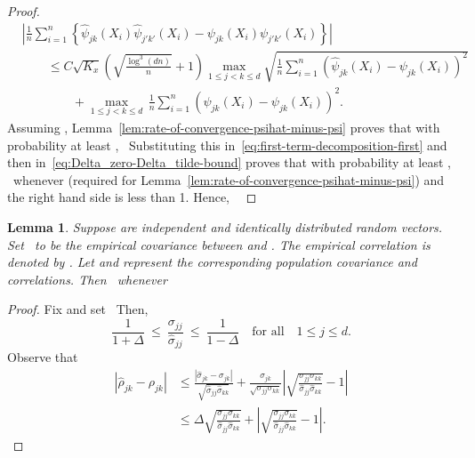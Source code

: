 \documentclass{article}
\newtheorem{lemma}{Lemma}
\begin{document}
\begin{appendices}
\begin{proof}
\begin{equation}\label{eq:first-term-decomposition-first}
\begin{split}
&\left|\frac{1}{n}\sum_{i=1}^n \left\{\widehat{\psi}_{jk}(X_i)\widehat{\psi}_{j'k'}(X_i) - \psi_{jk}(X_i)\psi_{j'k'}(X_i)\right\}\right|\\ &\qquad\le C\sqrt{K_x}\left(\sqrt{\frac{\log^3(dn)}{n}} + 1\right)\max_{1\le j < k\le d}\sqrt{\frac{1}{n}\sum_{i=1}^n \left(\widehat{\psi}_{jk}(X_i) - \psi_{jk}(X_i)\right)^2}\\ &\qquad\qquad+ \max_{1\le j < k\le d}\,{\frac{1}{n}\sum_{i=1}^n \left(\widehat{\psi}_{jk}(X_i) - \psi_{jk}(X_i)\right)^2}.
\end{split}
\end{equation}
Assuming  , Lemma~\ref{lem:rate-of-convergence-psihat-minus-psi} proves that with probability at least  ,
\ Substituting this in~\eqref{eq:first-term-decomposition-first} and then in~\eqref{eq:Delta_zero-Delta_tilde-bound} proves that with probability at least  ,
\ whenever
  (required for Lemma~\ref{lem:rate-of-convergence-psihat-minus-psi}) and the right hand side is less than 1. Hence,
\ \end{proof}
\begin{lemma}\label{lem:correlations-from-covariances}
Suppose   are independent and identically distributed random vectors. Set
\ to be the empirical covariance between   and  . The empirical correlation   is denoted by  . Let   and   represent the corresponding population covariance and correlations. Then
\ whenever
\ \end{lemma}
\begin{proof}
Fix   and set
\ Then,
\begin{equation}\label{eq:Delta-definition}
\frac{1}{1 + \Delta} ~\le~ \frac{\sigma_{jj}}{\widehat{\sigma}_{jj}} ~\le~ \frac{1}{1-\Delta}\quad\mbox{for all}\quad 1\le j\le d.
\end{equation}
Observe that
\begin{align*}
\left|\widehat{\rho}_{jk} - \rho_{jk}\right| &\le \frac{|\widehat{\sigma}_{jk} - \sigma_{jk}|}{\sqrt{\widehat{\sigma}_{jj}\widehat{\sigma}_{kk}}} + \frac{\sigma_{jk}}{\sqrt{\sigma_{jj}\sigma_{kk}}}\left|\sqrt{\frac{\sigma_{jj}\sigma_{kk}}{\widehat{\sigma}_{jj}\widehat{\sigma}_{kk}}} - 1\right|\\ &\le \Delta\sqrt{\frac{\sigma_{jj}\sigma_{kk}}{\widehat{\sigma}_{jj}\widehat{\sigma}_{kk}}} + \left|\sqrt{\frac{\sigma_{jj}\sigma_{kk}}{\widehat{\sigma}_{jj}\widehat{\sigma}_{kk}}} - 1\right|.
\end{align*}

\end{proof}
\end{appendices}
\end{document}
